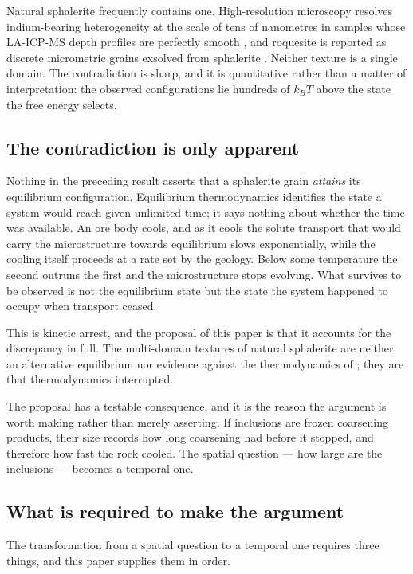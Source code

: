 \documentclass[preprint,12pt,authoryear]{elsarticle}
\begin{document}
Natural sphalerite frequently contains one. High-resolution microscopy resolves
indium-bearing heterogeneity at the scale of tens of nanometres in samples whose
LA-ICP-MS depth profiles are perfectly smooth \citep{cook2009,frenzel2016}, and
roquesite is reported as discrete micrometric grains exsolved from sphalerite
\citep{moura2007}. Neither texture is a single domain. The contradiction is
sharp, and it is quantitative rather than a matter of interpretation: the
observed configurations lie hundreds of $k_BT$ above the state the free energy
selects.

\subsection{The contradiction is only apparent}

Nothing in the preceding result asserts that a sphalerite grain \emph{attains}
its equilibrium configuration. Equilibrium thermodynamics identifies the state a
system would reach given unlimited time; it says nothing about whether the time
was available. An ore body cools, and as it cools the solute transport that
would carry the microstructure towards equilibrium slows exponentially, while
the cooling itself proceeds at a rate set by the geology. Below some
temperature the second outruns the first and the microstructure stops evolving.
What survives to be observed is not the equilibrium state but the state the
system happened to occupy when transport ceased.

This is kinetic arrest, and the proposal of this paper is that it accounts for
the discrepancy in full. The multi-domain textures of natural sphalerite are
neither an alternative equilibrium nor evidence against the thermodynamics of
\citet{yu2026b}; they are that thermodynamics interrupted.

The proposal has a testable consequence, and it is the reason the argument is
worth making rather than merely asserting. If inclusions are frozen coarsening
products, their size records how long coarsening had before it stopped, and
therefore how fast the rock cooled. The spatial question --- how large are the
inclusions --- becomes a temporal one.

\subsection{What is required to make the argument}

The transformation from a spatial question to a temporal one requires three
things, and this paper supplies them in order.
\end{document}
